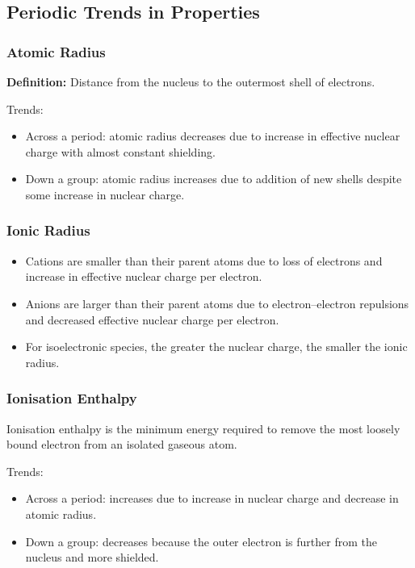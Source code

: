 \documentclass[12pt,a4paper]{article}
\begin{document}
\subsection{Periodic Trends in Properties}

\subsubsection{Atomic Radius}
\textbf{Definition:} Distance from the nucleus to the outermost shell of electrons.

Trends:
\begin{itemize}
    \item Across a period: atomic radius decreases due to increase in effective nuclear charge with almost constant shielding.
    \item Down a group: atomic radius increases due to addition of new shells despite some increase in nuclear charge.
\end{itemize}

\subsubsection{Ionic Radius}
\begin{itemize}
    \item Cations are smaller than their parent atoms due to loss of electrons and increase in effective nuclear charge per electron.
    \item Anions are larger than their parent atoms due to electron–electron repulsions and decreased effective nuclear charge per electron.
    \item For isoelectronic species, the greater the nuclear charge, the smaller the ionic radius.
\end{itemize}

\subsubsection{Ionisation Enthalpy}
Ionisation enthalpy is the minimum energy required to remove the most loosely bound electron from an isolated gaseous atom.  

Trends:
\begin{itemize}
    \item Across a period: increases due to increase in nuclear charge and decrease in atomic radius.
    \item Down a group: decreases because the outer electron is further from the nucleus and more shielded.
\end{itemize}
\end{document}
